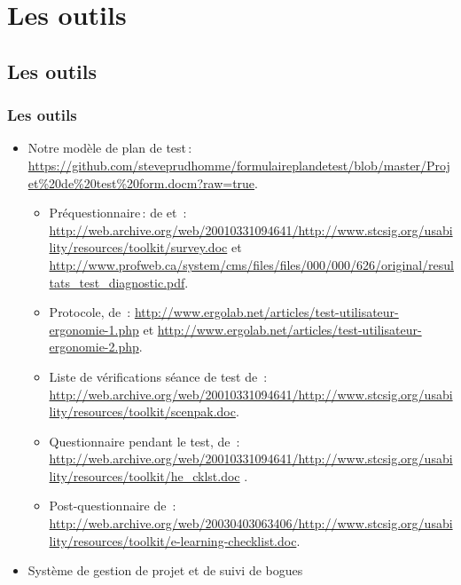 	
	\section{Les outils} 
	\subsection{Les outils} 
		\begin{frame}[allowframebreaks]
		\frametitle{Les outils}
			\begin {itemize}
			\item Notre modèle de plan de test\,: \url{https://github.com/steveprudhomme/formulaireplandetest/blob/master/Projet\%20de\%20test\%20form.docm?raw=true}.
				\begin {itemize}
				\item Préquestionnaire\,: de \citet{xerox1995b} et \citet{apop2013a}\,: \url{http://web.archive.org/web/20010331094641/http://www.stcsig.org/usability/resources/toolkit/survey.doc} et  \url{http://www.profweb.ca/system/cms/files/files/000/000/626/original/resultats_test_diagnostic.pdf}.
				\item Protocole, de \citet{ergolab2014a}\,: \url{http://www.ergolab.net/articles/test-utilisateur-ergonomie-1.php} et \url{http://www.ergolab.net/articles/test-utilisateur-ergonomie-2.php}.
				\item Liste de vérifications séance de test de \citet{naughton1995a}\,: \url{http://web.archive.org/web/20010331094641/http://www.stcsig.org/usability/resources/toolkit/scenpak.doc}.
				\item Questionnaire pendant le test, de \citet{xerox1995a}\,: \url{http://web.archive.org/web/20010331094641/http://www.stcsig.org/usability/resources/toolkit/he\_cklst.doc} .
				\item Post-questionnaire de \citet{miller2002a}\,: \url{http://web.archive.org/web/20030403063406/http://www.stcsig.org/usability/resources/toolkit/e-learning-checklist.doc}.
				\end{itemize}
			\framebreak
			\item Système de gestion de projet et de suivi de bogues 
			

\end{itemize}
\end{frame}
